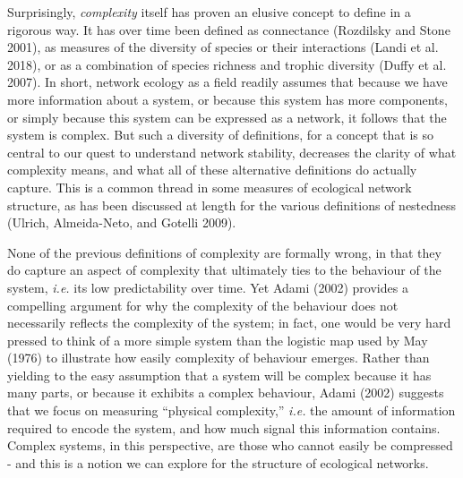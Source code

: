 \documentclass[10pt,oneside]{article}
\begin{document}
Surprisingly, \emph{complexity} itself has proven an elusive concept to
define in a rigorous way. It has over time been defined as connectance
(Rozdilsky and Stone 2001), as measures of the diversity of species or
their interactions (Landi et al. 2018), or as a combination of species
richness and trophic diversity (Duffy et al. 2007). In short, network
ecology as a field readily assumes that because we have more information
about a system, or because this system has more components, or simply
because this system can be expressed as a network, it follows that the
system is complex. But such a diversity of definitions, for a concept
that is so central to our quest to understand network stability,
decreases the clarity of what complexity means, and what all of these
alternative definitions do actually capture. This is a common thread in
some measures of ecological network structure, as has been discussed at
length for the various definitions of nestedness (Ulrich, Almeida-Neto,
and Gotelli 2009).

None of the previous definitions of complexity are formally wrong, in
that they do capture an aspect of complexity that ultimately ties to the
behaviour of the system, \emph{i.e.} its low predictability over time.
Yet Adami (2002) provides a compelling argument for why the complexity
of the behaviour does not necessarily reflects the complexity of the
system; in fact, one would be very hard pressed to think of a more
simple system than the logistic map used by May (1976) to illustrate how
easily complexity of behaviour emerges. Rather than yielding to the easy
assumption that a system will be complex because it has many parts, or
because it exhibits a complex behaviour, Adami (2002) suggests that we
focus on measuring ``physical complexity,'' \emph{i.e.} the amount of
information required to encode the system, and how much signal this
information contains. Complex systems, in this perspective, are those
who cannot easily be compressed - and this is a notion we can explore
for the structure of ecological networks.
\end{document}
